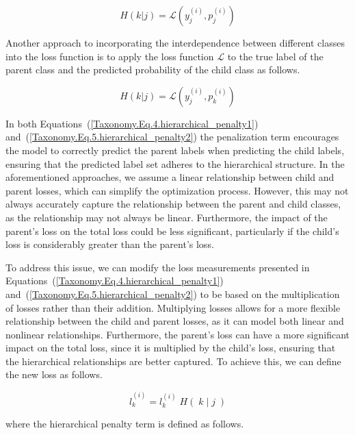 \begin{equation}
    H(k \vert j)=\mathcal{L} \left(y_j^{(i)},p_j^{(i)}\right)
    \label{Taxonomy.Eq.4.hierarchical_penalty1}
\end{equation}

Another approach to incorporating the interdependence between different classes into the loss function is to apply the loss function $\mathcal{L} $ to the true label of the parent class and the predicted probability of the child class as follows.

\begin{equation}
    H\left(k\vert j\right) = \mathcal{L} \left(y_j^{(i)},p_k^{(i)}\right)
    \label{Taxonomy.Eq.5.hierarchical_penalty2}
\end{equation}

In both Equations~(\ref{Taxonomy.Eq.4.hierarchical_penalty1}) and~(\ref{Taxonomy.Eq.5.hierarchical_penalty2}) the penalization term encourages the model to correctly predict the parent labels when predicting the child labels, ensuring that the predicted label set adheres to the hierarchical structure. In the aforementioned approaches, we assume a linear relationship between child and parent losses, which can simplify the optimization process. However, this may not always accurately capture the relationship between the parent and child classes, as the relationship may not always be linear. Furthermore, the impact of the parent's loss on the total loss could be less significant, particularly if the child's loss is considerably greater than the parent's loss.

To address this issue, we can modify the loss measurements presented in Equations~(\ref{Taxonomy.Eq.4.hierarchical_penalty1}) and~(\ref{Taxonomy.Eq.5.hierarchical_penalty2})  to be based on the multiplication of losses rather than their addition. Multiplying losses allows for a more flexible relationship between the child and parent losses, as it can model both linear and nonlinear relationships. Furthermore, the parent's loss can have a more significant impact on the total loss, since it is multiplied by the child's loss, ensuring that the hierarchical relationships are better captured. To achieve this, we can define the new loss as follows.

\begin{equation}
    \label{Taxonomy.Eq.newloss}
    \widehat{l}_k^{(i)}=l_k^{(i)}\;H\left(\;k\;\vert\;j\;\right)
\end{equation}

where the hierarchical penalty term is defined as follows.

